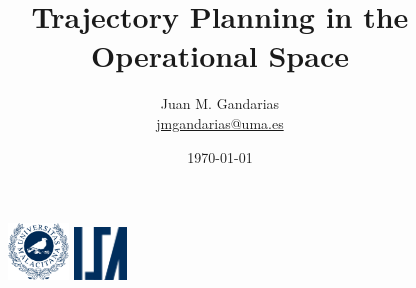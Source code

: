 \documentclass[10pt, aspectratio=169]{beamer}
\title[\href{https://jmgandarias.com}{\textcolor{white}{jmgandarias.com}}]{Trajectory Planning in the Operational Space}
\theoremstyle{remark}
\theoremstyle{definition}
\begin{document}
\author[Systems Engineering and Automation]{
	\large
	Juan M. Gandarias\\
    \footnotesize \href{mailto:jmgandarias@uma.es}{jmgandarias@uma.es}
}



\date{\today}

\begin{noheadline}
\begin{frame}
    \maketitle
    \vspace{-1cm}
    \begin{figure}
		\centering
		\includegraphics[height=1.5cm]{./style_files_uma/logo_uma}
        \hspace{10cm}
        \includegraphics[height=1.4cm]{./style_files_uma/logo_isa}
	\end{figure}
 \end{frame}
\end{noheadline}
\end{document}
